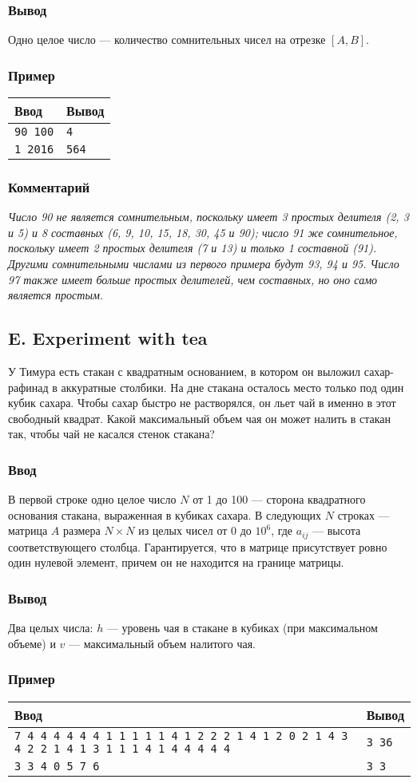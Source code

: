 \documentclass[10pt, a4paper]{article}
\newcommand{\informat}[1]
{
	\subsubsection*{Ввод} #1
}
\newcommand{\outformat}[1]
{
	\subsubsection*{Вывод} #1
}
\newcommand{\examplee}[4]
{
	\subsubsection*{Пример}
	\noindent
	\begin{center}
	\begin{tabularx}{\linewidth}{|X|X|}
	\hline
	Ввод 	& Вывод  	\\
	\hline
	{\tt #1} & {\tt #2}	\\
	\hline
	{\tt #3} & {\tt #4}	\\
	\hline
	\end{tabularx}
	\end{center}
}
\newcommand{\excomm}[1]
{
	\subsubsection*{Комментарий}
	\textit{#1}
}
\begin{document}
\outformat{Одно целое число --- количество сомнительных чисел на отрезке $[A, B]$.}

\examplee{90 100}{4}{1 2016}{564}

\excomm{Число 90 не является сомнительным, поскольку имеет 3 простых делителя (2, 3 и 5) и 8 составных (6, 9, 10, 15, 18, 30, 45 и 90); число 91 же сомнительное, поскольку имеет 2 простых делителя (7 и 13) и только 1 составной (91). Другими сомнительными числами из первого примера будут 93, 94 и 95. Число 97 также имеет больше простых делителей, чем составных, но оно само является простым.}



\subsection*{E. Experiment with tea}

У Тимура есть стакан с квадратным основанием, в котором он выложил сахар-рафинад в аккуратные столбики. На дне стакана осталось место только под один кубик сахара. Чтобы сахар быстро не растворялся, он льет чай в именно в этот свободный квадрат. Какой максимальный объем чая он может налить в стакан так, чтобы чай не касался стенок стакана?



\informat{В первой строке одно целое число $N$ от 1 до 100 --- сторона квадратного основания стакана, выраженная в кубиках сахара. \newline
В следующих $N$ строках ---  матрица $A$ размера $N \times N$ из целых чисел от 0 до $10^6$, где $a_{ij}$ --- высота соответствующего столбца. Гарантируется, что в матрице присутствует ровно один нулевой элемент, причем он не находится на границе матрицы.}

\outformat{Два целых числа: $h$ --- уровень чая в стакане в кубиках (при максимальном объеме) и $v$ --- максимальный объем налитого чая.}

\examplee{7 \newline
4 4 4 4 4 4 4  \newline
4 1 1 1 1 1 4  \newline
4 1 2 2 2 1 4  \newline
4 1 2 0 2 1 4  \newline
4 3 4 2 2 1 4  \newline
1 1 3 1 1 1 4  \newline
1 1 4 4 4 4 4}{3 36}
{3 \newline
2 3 4 \newline
9 0 5 \newline
8 7 6}{3 3}
\end{document}
